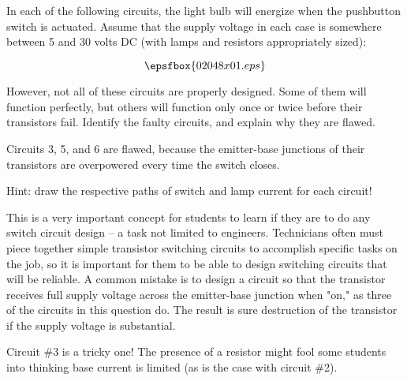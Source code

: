 

In each of the following circuits, the light bulb will energize when the pushbutton switch is actuated.  Assume that the supply voltage in each case is somewhere between 5 and 30 volts DC (with lamps and resistors appropriately sized):

$$\epsfbox{02048x01.eps}$$

However, not all of these circuits are properly designed.  Some of them will function perfectly, but others will function only once or twice before their transistors fail.  Identify the faulty circuits, and explain why they are flawed.







Circuits 3, 5, and 6 are flawed, because the emitter-base junctions of their transistors are overpowered every time the switch closes.

\vskip 10pt

Hint: draw the respective paths of switch and lamp current for each circuit!







This is a very important concept for students to learn if they are to do any switch circuit design -- a task not limited to engineers.  Technicians often must piece together simple transistor switching circuits to accomplish specific tasks on the job, so it is important for them to be able to design switching circuits that will be reliable.  A common mistake is to design a circuit so that the transistor receives full supply voltage across the emitter-base junction when "on," as three of the circuits in this question do.  The result is sure destruction of the transistor if the supply voltage is substantial.

Circuit \#3 is a tricky one!  The presence of a resistor might fool some students into thinking base current is limited (as is the case with circuit \#2).




